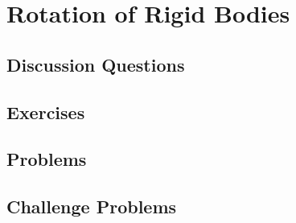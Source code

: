 
\chapter{Rotation of Rigid Bodies}

\section{Discussion Questions}

\section{Exercises}

\section{Problems}

\section{Challenge Problems}
